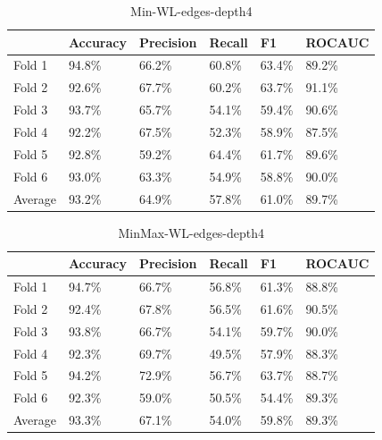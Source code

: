\documentclass{IEEEtran}
\begin{document}
\begin{table}
    \centering
    \begin{tabular}{l||llll|l}
        \textbf{} & \textbf{Accuracy} & \textbf{Precision} & \textbf{Recall} & \textbf{F1} & \textbf{ROCAUC} \\
        \hline \hline
        Fold 1    & 94.8\%            & 66.2\%             & 60.8\%          & 63.4\%      & 89.2\%          \\
        Fold 2    & 92.6\%            & 67.7\%             & 60.2\%          & 63.7\%      & 91.1\%          \\
        Fold 3    & 93.7\%            & 65.7\%             & 54.1\%          & 59.4\%      & 90.6\%          \\
        Fold 4    & 92.2\%            & 67.5\%             & 52.3\%          & 58.9\%      & 87.5\%          \\
        Fold 5    & 92.8\%            & 59.2\%             & 64.4\%          & 61.7\%      & 89.6\%          \\
        Fold 6    & 93.0\%            & 63.3\%             & 54.9\%          & 58.8\%      & 90.0\%          \\
        \hline
        Average   & 93.2\%            & 64.9\%             & 57.8\%          & 61.0\%      & 89.7\%          \\
    \end{tabular}
    \caption{Min-WL-edges-depth4}
\end{table}


\begin{table}
    \centering
    \begin{tabular}{l||llll|l}
        \textbf{} & \textbf{Accuracy} & \textbf{Precision} & \textbf{Recall} & \textbf{F1} & \textbf{ROCAUC} \\
        \hline \hline
        Fold 1    & 94.7\%            & 66.7\%             & 56.8\%          & 61.3\%      & 88.8\%          \\
        Fold 2    & 92.4\%            & 67.8\%             & 56.5\%          & 61.6\%      & 90.5\%          \\
        Fold 3    & 93.8\%            & 66.7\%             & 54.1\%          & 59.7\%      & 90.0\%          \\
        Fold 4    & 92.3\%            & 69.7\%             & 49.5\%          & 57.9\%      & 88.3\%          \\
        Fold 5    & 94.2\%            & 72.9\%             & 56.7\%          & 63.7\%      & 88.7\%          \\
        Fold 6    & 92.3\%            & 59.0\%             & 50.5\%          & 54.4\%      & 89.3\%          \\
        \hline
        Average   & 93.3\%            & 67.1\%             & 54.0\%          & 59.8\%      & 89.3\%          \\
    \end{tabular}
    \caption{MinMax-WL-edges-depth4}
\end{table}
\end{document}
